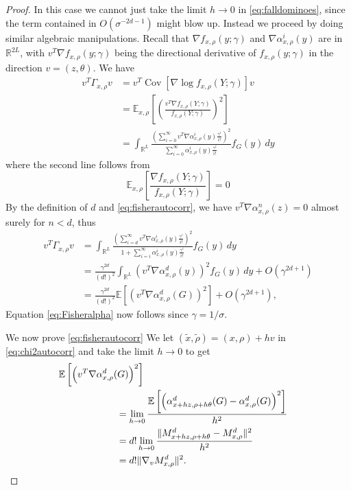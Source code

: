 \documentclass{IEEEtran}
\numberwithin{equation}{section}
\numberwithin{figure}{section}
\theoremstyle{plain}
\theoremstyle{definition}
\theoremstyle{remark}
\theoremstyle{plain}
\theoremstyle{remark}
\theoremstyle{plain}
\theoremstyle{plain}
\theoremstyle{remark}
\newcommand{\reals}{\mathbb{R}}
\newcommand{\RL}{\mathbb{R}^L}
\newcommand{\E}{\mathbb{E}}
\DeclareMathOperator*{\Cov}{Cov}
\newcommand{\OO}{{O}}
\newcommand{\error}{G}
\begin{document}
\begin{proof}
	In this case we cannot just take the limit $h\rightarrow 0$ in \eqref{eq:falldominoes}, since the term contained in $\OO(\sigma^{-2d-1})$ might blow up. Instead we proceed by doing similar algebraic manipulations. Recall that $\nabla f_{x,\rho}(y;\gamma)$ and $\nabla \alpha^i_{x,\rho}(y)$ are in $\reals^{2L}$, with $v^T\nabla f_{x,\rho}(y;\gamma)$ being the directional derivative of $f_{x,\rho}(y;\gamma)$ in the direction $v=(z,\theta)$. We have
	\begin{align*}
	v^T \Gamma_{x,\rho} v &=v^T \Cov[\nabla \log f_{x,\rho}(Y;\gamma)] v\\
	&=\E_{x,\rho}\left[\left(\frac{v^T \nabla f_{x,\rho}(Y;\gamma)}{f_{x,\rho}(Y;\gamma)}\right)^2\right] \\
	&=\int_{\RL} \frac{\left(\sum\limits_{i=0}^\infty v^T \nabla \alpha^i_{x,\rho}(y)\frac{\gamma^i}{i!}\right)^2}
	{\sum\limits_{i=0}^\infty \alpha^i_{x,\rho}(y)\frac{\gamma^i}{i!}} f_\error(y)\,dy
	\end{align*}
	where the second line follows from
	\[ \E_{x,\rho}\left[\frac{\nabla f_{x,\rho}(Y;\gamma)}{f_{x,\rho}(Y;\gamma)}\right]=0 \]
	By the definition of $d$ and \eqref{eq:fisherautocorr}, we have $v^T \nabla \alpha_{x,\rho}^n(z)=0$ almost surely for $n< d$, thus
	\begin{align*}
	v^T \Gamma_{x,\rho} v &=\int_{\RL}\frac{\left(\sum\limits_{i=d}^\infty v^T \nabla \alpha^i_{x,\rho}(y)\frac{\gamma^i}{i!}\right)^2}
	{1+\sum\limits_{i=i}^\infty \alpha^i_{x,\rho}(y)\frac{\gamma^i}{i!}} f_\error(y)\,dy\\
	&= \frac{\gamma^{2d}}{(d!)^2} \int_{\RL} \left(v^T \nabla \alpha_{x,\rho}^d(y)\right)^2 f_\error(y)\,dy+\OO(\gamma^{2d+1})\\
	&=\frac{\gamma^{2d}}{(d!)^2}  \E\left[\left(v^T \nabla \alpha_{x,\rho}^d(\error)\right)^2\right]+\OO(\gamma^{2d+1}),
	\end{align*}
	Equation \eqref{eq:Fisheralpha} now follows since $\gamma=1/\sigma$.
	
	
	We now prove \eqref{eq:fisherautocorr} We let $(\tilde x,\tilde \rho)=(x,\rho)+hv$ in \eqref{eq:chi2autocorr} and take the limit $h\rightarrow 0$ to get
	\begin{align*}
	\E\left[\left(v^T \nabla \alpha_{x,\rho}^d(\error)\right)^2\right]\hspace{-1cm}\\
	&=\lim_{h\rightarrow 0}
	\frac{\E\left[\left(\alpha_{x+hz,\rho+h\theta}^d(\error)-\alpha_{x,\rho}^d(\error)\right)^2\right]}{h^2}\\
	&=d!\lim_{h\rightarrow 0}
	\frac{ \|M^d_{x+hz,\rho+h\theta}-M^d_{x,\rho}\|^2}{h^2}\\
	&=d! \|\nabla_v M^d_{x,\rho} \|^2.
	\end{align*}
\end{proof}
\end{document}
